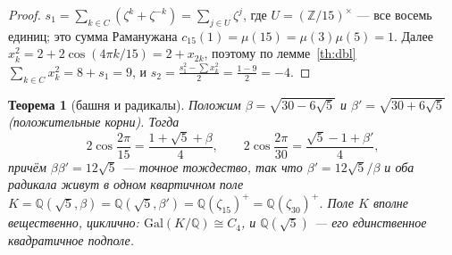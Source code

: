 \documentclass[11pt,a4paper]{article}
\theoremstyle{plain}
\newtheorem{theorem}{Теорема}
\theoremstyle{definition}
\theoremstyle{remark}
\newcommand{\ZZ}{\mathbb{Z}}
\newcommand{\QQ}{\mathbb{Q}}
\begin{document}
\begin{proof}
$s_1=\sum_{k\in C}(\zeta^k+\zeta^{-k})=\sum_{j\in U}\zeta^j$,
где $U=(\ZZ/15)^\times$ --- все восемь единиц; это сумма
Раманужана $c_{15}(1)=\mu(15)=\mu(3)\mu(5)=1$. Далее
$x_k^2=2+2\cos(4\pi k/15)=2+x_{2k}$, поэтому по лемме~\ref{th:dbl}
$\sum_{k\in C}x_k^2=8+s_1=9$, и
$s_2=\frac{s_1^2-\sum x_k^2}{2}=\frac{1-9}{2}=-4$.
\end{proof}

\begin{theorem}[башня и радикалы]\label{th:tower}
Положим $\beta=\sqrt{30-6\sqrt5}$ и $\beta'=\sqrt{30+6\sqrt5}$
(положительные корни). Тогда
\[
  2\cos\frac{2\pi}{15}=\frac{1+\sqrt5+\beta}{4},
  \qquad
  2\cos\frac{2\pi}{30}=\frac{\sqrt5-1+\beta'}{4},
\]
причём $\beta\beta'=12\sqrt5$ --- точное тождество, так что
$\beta'=12\sqrt5/\beta$ и оба радикала живут в \emph{одном}
квартичном поле $K=\QQ(\sqrt5,\beta)=\QQ(\sqrt5,\beta')
=\QQ(\zeta_{15})^+=\QQ(\zeta_{30})^+$.
Поле $K$ вполне вещественно, циклично:
$\mathrm{Gal}(K/\QQ)\cong C_4$, и $\QQ(\sqrt5)$ --- его
единственное квадратичное подполе.
\end{theorem}
\end{document}
